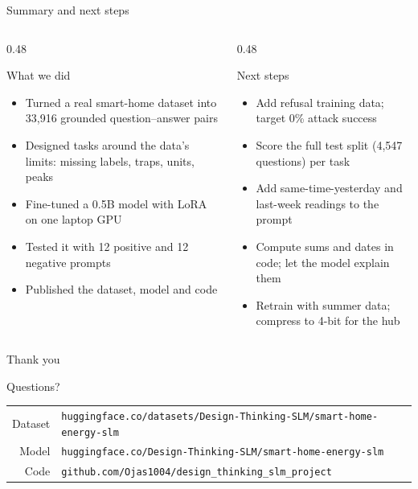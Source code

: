 \documentclass[aspectratio=169,11pt]{beamer}
\begin{document}
\begin{frame}{Summary and next steps}
  \begin{columns}[T]
    \begin{column}{0.48\textwidth}
      \begin{block}{What we did}
        \small
        \begin{itemize}\setlength{\itemsep}{0.3em}
          \item Turned a real smart-home dataset into 33,916 grounded question--answer pairs
          \item Designed tasks around the data's limits: missing labels, traps, units, peaks
          \item Fine-tuned a 0.5B model with LoRA on one laptop GPU
          \item Tested it with 12 positive and 12 negative prompts
          \item Published the dataset, model and code
        \end{itemize}
      \end{block}
    \end{column}
    \begin{column}{0.48\textwidth}
      \begin{block}{Next steps}
        \small
        \begin{itemize}\setlength{\itemsep}{0.3em}
          \item Add refusal training data; target 0\% attack success
          \item Score the full test split (4,547 questions) per task
          \item Add same-time-yesterday and last-week readings to the prompt
          \item Compute sums and dates in code; let the model explain them
          \item Retrain with summer data; compress to 4-bit for the hub
        \end{itemize}
      \end{block}
    \end{column}
  \end{columns}
\end{frame}

\begin{frame}[plain]
  \centering\vfill
  {\color{ink}Thank you\par}
  \vspace{0.3em}{\color{brand}\rule{3cm}{3pt}}\par\vspace{1.2em}
  {\Large\color{ink2}Questions?\par}
  \vspace{2em}
  \small
  \begin{tabular}{@{}r l@{}}
    Dataset & \texttt{huggingface.co/datasets/Design-Thinking-SLM/smart-home-energy-slm} \\
    Model   & \texttt{huggingface.co/Design-Thinking-SLM/smart-home-energy-slm} \\
    Code    & \texttt{github.com/Ojas1004/design\_thinking\_slm\_project} \\
  \end{tabular}
  \vfill
\end{frame}
\end{document}
